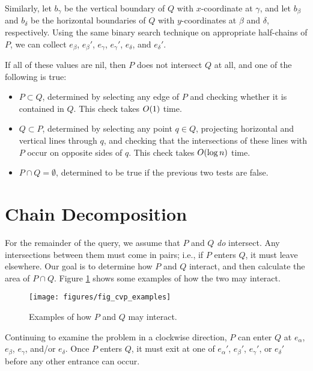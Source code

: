 Similarly, let $b_\gamma$ be the vertical boundary of $Q$ with $x$-coordinate at $\gamma$, and let $b_\beta$ and $b_\delta$ be the horizontal boundaries of $Q$ with $y$-coordinates at $\beta$ and $\delta$, respectively.  Using the same binary search technique on appropriate half-chains of $P$, we can collect $e_\beta$, $e_\beta'$, $e_\gamma$, $e_\gamma'$, $e_\delta$, and $e_\delta'$.  

If all of these values are nil, then $P$ does not intersect $Q$ at all, and one of the following is true:

\begin{itemize}
 \item $P \subset Q$, determined by selecting any edge of $P$ and checking whether it is contained in $Q$. This check takes $O\!\left(1\right)$ time.

 \item $Q \subset P$, determined by selecting any point $q \in Q$, projecting horizontal and vertical lines through $q$, and checking that the intersections of these lines with $P$ occur on opposite sides of $q$. This check takes $O\!\left(\log{n}\right)$ time.

 \item $P \cap Q = \emptyset$, determined to be true if the previous two tests are false.
\end{itemize}


\section{Chain Decomposition}

For the remainder of the query, we assume that $P$ and $Q$ \emph{do} intersect. 
Any intersections between them must come in pairs; i.e., if $P$ enters $Q$, it must leave elsewhere.
Our goal is to determine how $P$ and $Q$ interact, and then calculate the area of $P \cap Q$.  Figure \ref{fig:convexp:examples} shows some examples of how the two may interact.

\begin{figure}[t]
\begin{center}
  \texttt{[image: figures/fig\_cvp\_examples]}
  \caption{Examples of how $P$ and $Q$ may interact.}
  \label{fig:convexp:examples}
\end{center}
\end{figure}

Continuing to examine the problem in a clockwise direction, $P$ can enter $Q$ at $e_\alpha$, $e_\beta$, $e_\gamma$, and/or $e_\delta$.  Once $P$ enters $Q$, it must exit at one of $e_\alpha'$, $e_\beta'$, $e_\gamma'$, or $e_\delta'$ before any other entrance can occur.

